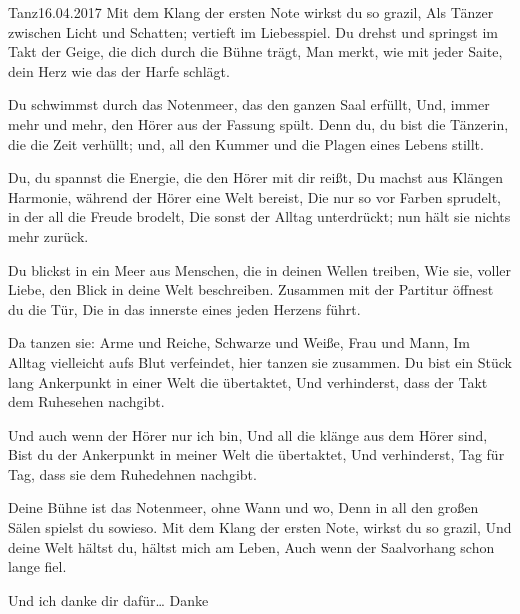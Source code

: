\begin{poem}[][ornafoot]{Tanz}{16.04.2017}
Mit dem Klang der ersten Note wirkst du so grazil,
Als Tänzer zwischen Licht und Schatten; vertieft im Liebesspiel.
Du drehst und springst im Takt der Geige, die dich durch die Bühne trägt,
Man merkt, wie mit jeder Saite, dein Herz wie das der Harfe schlägt.

Du schwimmst durch das Notenmeer, das den ganzen Saal erfüllt,
Und, immer mehr und mehr, den Hörer aus der Fassung spült.
Denn du, du bist die Tänzerin, die die Zeit verhüllt; und,
all den Kummer und die Plagen eines Lebens stillt.

Du, du spannst die Energie, die den Hörer mit dir reißt,
Du machst aus Klängen Harmonie, während der Hörer eine Welt bereist,
Die nur so vor Farben sprudelt, in der all die Freude brodelt,
Die sonst der Alltag unterdrückt; nun hält sie nichts mehr zurück.

Du blickst in ein Meer aus Menschen, die in deinen Wellen treiben,
Wie sie, voller Liebe, den Blick in deine Welt beschreiben.
Zusammen mit der Partitur öffnest du die Tür,
Die in das innerste eines jeden Herzens führt.

Da tanzen sie: Arme und Reiche, Schwarze und Weiße, Frau und Mann,
Im Alltag vielleicht aufs Blut verfeindet, hier tanzen sie zusammen.
Du bist ein Stück lang Ankerpunkt in einer Welt die übertaktet,
Und verhinderst, dass der Takt dem Ruhesehen nachgibt.

Und auch wenn der Hörer nur ich bin,
Und all die klänge aus dem Hörer sind,
Bist du der Ankerpunkt in meiner Welt die übertaktet,
Und verhinderst, Tag für Tag, dass sie dem Ruhedehnen nachgibt.

Deine Bühne ist das Notenmeer, ohne Wann und wo,
Denn in all den großen Sälen spielst du sowieso.
Mit dem Klang der ersten Note, wirkst du so grazil,
Und deine Welt hältst du, hältst mich am Leben,
Auch wenn der Saalvorhang schon lange fiel.

Und ich danke dir dafür\ldots
Danke
\end{poem}